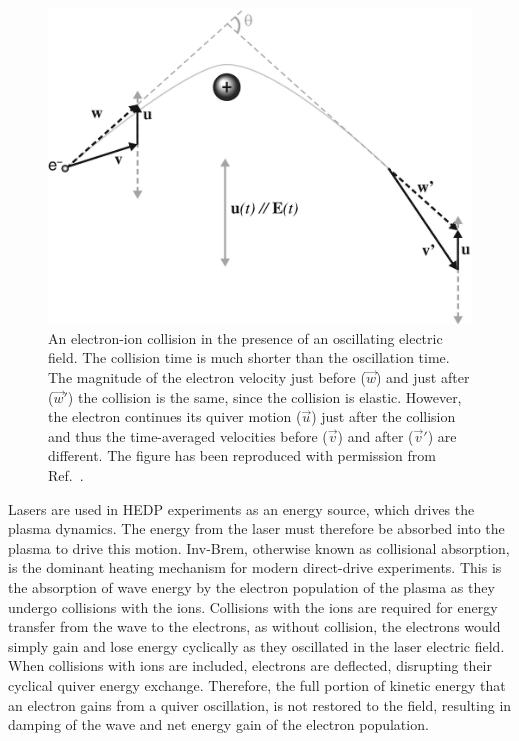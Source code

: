 \begin{figure}[t!]
    \includegraphics[width=0.6\linewidth]{Theory/Images/Inv_Brem.png}
    \centering
    \caption{An electron-ion collision in the presence of an oscillating electric field.
    The collision time is much shorter than the oscillation time.
    The magnitude of the electron velocity just before ($\vec{w}$) and just after ($\vec{w}'$) the collision is the same, since the collision is elastic.
    However, the electron continues its quiver motion ($\vec{u}$) just after the collision and thus the time-averaged velocities before ($\vec{v}$) and after ($\vec{v}'$) are different.
    The figure has been reproduced with permission from Ref.~\cite{michel_introduction_2023}.}%
    \label{fig:theory_inv_brem}
\end{figure}

Lasers are used in \ac{HEDP} experiments as an energy source, which drives the plasma dynamics.
The energy from the laser must therefore be absorbed into the plasma to drive this motion.
\ac{Inv-Brem}, otherwise known as collisional absorption, is the dominant heating mechanism for modern direct-drive experiments.
This is the absorption of wave energy by the electron population of the plasma as they undergo collisions with the ions.
Collisions with the ions are required for energy transfer from the wave to the electrons, as without collision, the electrons would simply gain and lose energy cyclically as they oscillated in the laser electric field.
When collisions with ions are included, electrons are deflected, disrupting their cyclical quiver energy exchange.
Therefore, the full portion of kinetic energy that an electron gains from a quiver oscillation, is not restored to the field, resulting in damping of the wave and net energy gain of the electron population.

